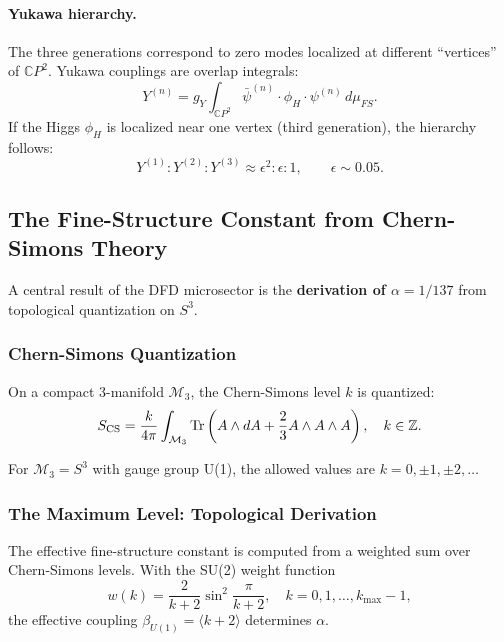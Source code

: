 \paragraph{Yukawa hierarchy.}
The three generations correspond to zero modes localized at different ``vertices'' of $\mathbb{C}P^2$. Yukawa couplings are overlap integrals:
\begin{equation}
Y^{(n)} = g_Y \int_{\mathbb{C}P^2} \bar{\psi}^{(n)} \cdot \phi_H \cdot \psi^{(n)} \, d\mu_{FS}.
\end{equation}
If the Higgs $\phi_H$ is localized near one vertex (third generation), the hierarchy follows:
\begin{equation}
Y^{(1)} : Y^{(2)} : Y^{(3)} \approx \epsilon^2 : \epsilon : 1, \qquad \epsilon \sim 0.05.
\end{equation}

\subsection{The Fine-Structure Constant from Chern-Simons Theory}\label{sec:alpha-derivation}

A central result of the DFD microsector is the \textbf{derivation of $\alpha = 1/137$} 
from topological quantization on $S^3$.

\subsubsection{Chern-Simons Quantization}

On a compact 3-manifold $\mathcal{M}_3$, the Chern-Simons level $k$ is quantized:
\begin{equation}
S_{\rm CS} = \frac{k}{4\pi} \int_{\mathcal{M}_3} \text{Tr}\left(A \wedge dA + \frac{2}{3} A \wedge A \wedge A\right), \quad k \in \mathbb{Z}.
\end{equation}

For $\mathcal{M}_3 = S^3$ with gauge group U(1), the allowed values are $k = 0, \pm 1, \pm 2, \ldots$

\subsubsection{The Maximum Level: Topological Derivation}

The effective fine-structure constant is computed from a weighted sum over Chern-Simons levels. With the SU(2) weight function
\begin{equation}
w(k) = \frac{2}{k+2}\sin^2\frac{\pi}{k+2}, \quad k = 0, 1, \ldots, k_{\max} - 1,
\end{equation}
the effective coupling $\beta_{U(1)} = \langle k + 2 \rangle$ determines $\alpha$.

